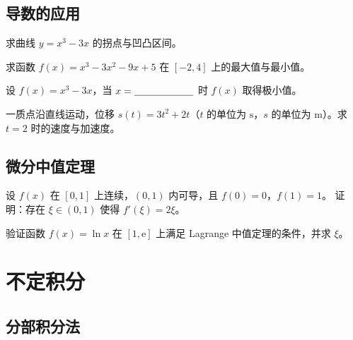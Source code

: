 \documentclass[answers]{kiritex}
\begin{document}
\subsection{导数的应用}

\begin{problem}
  求曲线 $y=x^3-3x$ 的拐点与凹凸区间。
\end{problem}

\begin{problem}
  求函数 $f(x)=x^3-3x^2-9x+5$ 在 $[-2,4]$ 上的最大值与最小值。
\end{problem}

\begin{problem}
  设 $f(x)=x^{3}-3x$，当 $x=\problemblock$ 时 $f(x)$ 取得极小值。
\end{problem}

\begin{problem}
  一质点沿直线运动，位移 $s(t)=3t^{2}+2t$（$t$ 的单位为 $\mathrm{s}$，$s$ 的单位为 $\mathrm{m}$）。求 $t=2$ 时的速度与加速度。
\end{problem}

\subsection{微分中值定理}

\begin{problem}
  设 $f(x)$ 在 $[0,1]$ 上连续，$(0,1)$ 内可导，且 $f(0)=0$，$f(1)=1$。
  证明：存在 $\xi\in(0,1)$ 使得 $f'(\xi)=2\xi$。
\end{problem}

\begin{problem}
  验证函数 $f(x)=\ln x$ 在 $[1,\mathrm{e}]$ 上满足 Lagrange 中值定理的条件，并求 $\xi$。
\end{problem}

\section{不定积分}

\subsection{分部积分法}
\end{document}
